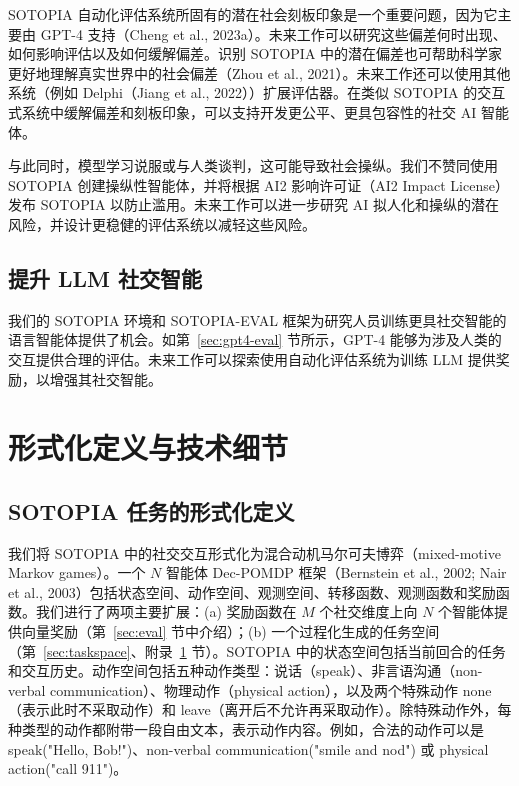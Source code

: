 \documentclass[11pt,a4paper]{article}
\begin{document}
SOTOPIA 自动化评估系统所固有的潜在社会刻板印象是一个重要问题，因为它主要由 GPT-4 支持（Cheng et al., 2023a）。未来工作可以研究这些偏差何时出现、如何影响评估以及如何缓解偏差。识别 SOTOPIA 中的潜在偏差也可帮助科学家更好地理解真实世界中的社会偏差（Zhou et al., 2021）。未来工作还可以使用其他系统（例如 Delphi（Jiang et al., 2022））扩展评估器。在类似 SOTOPIA 的交互式系统中缓解偏差和刻板印象，可以支持开发更公平、更具包容性的社交 AI 智能体。

与此同时，模型学习说服或与人类谈判，这可能导致社会操纵。我们不赞同使用 SOTOPIA 创建操纵性智能体，并将根据 AI2 影响许可证（AI2 Impact License）发布 SOTOPIA 以防止滥用。未来工作可以进一步研究 AI 拟人化和操纵的潜在风险，并设计更稳健的评估系统以减轻这些风险。

\subsection*{提升 LLM 社交智能}

我们的 SOTOPIA 环境和 SOTOPIA-EVAL 框架为研究人员训练更具社交智能的语言智能体提供了机会。如第~\ref{sec:gpt4-eval} 节所示，GPT-4 能够为涉及人类的交互提供合理的评估。未来工作可以探索使用自动化评估系统为训练 LLM 提供奖励，以增强其社交智能。

\section{形式化定义与技术细节}
\label{app:formal}

\subsection{SOTOPIA 任务的形式化定义}

我们将 SOTOPIA 中的社交交互形式化为混合动机马尔可夫博弈（mixed-motive Markov games）。一个 $N$ 智能体 Dec-POMDP 框架（Bernstein et al., 2002; Nair et al., 2003）包括状态空间、动作空间、观测空间、转移函数、观测函数和奖励函数。我们进行了两项主要扩展：(a) 奖励函数在 $M$ 个社交维度上向 $N$ 个智能体提供向量奖励（第~\ref{sec:eval} 节中介绍）；(b) 一个过程化生成的任务空间（第~\ref{sec:taskspace}、附录~\ref{app:formal} 节）。SOTOPIA 中的状态空间包括当前回合的任务和交互历史。动作空间包括五种动作类型：说话（speak）、非言语沟通（non-verbal communication）、物理动作（physical action），以及两个特殊动作 none（表示此时不采取动作）和 leave（离开后不允许再采取动作）。除特殊动作外，每种类型的动作都附带一段自由文本，表示动作内容。例如，合法的动作可以是 speak("Hello, Bob!")、non-verbal communication("smile and nod") 或 physical action("call 911")。
\end{document}
